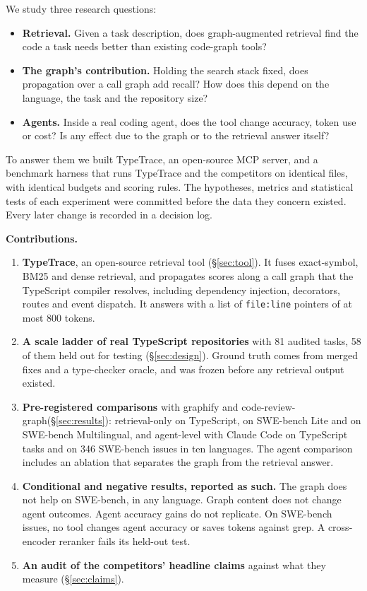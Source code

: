 \documentclass[sigconf,nonacm]{acmart}
\newcommand{\tool}{TypeTrace\xspace}
\newcommand{\gfy}{graphify\xspace}
\newcommand{\crg}{code-review-graph\xspace}
\begin{document}
We study three research questions:
\begin{itemize}
\item[\textbf{RQ1}] \textbf{Retrieval.} Given a task description, does graph-augmented retrieval find the code a task needs better than existing code-graph tools?
\item[\textbf{RQ2}] \textbf{The graph's contribution.} Holding the search stack fixed, does propagation over a call graph add recall? How does this depend on the language, the task and the repository size?
\item[\textbf{RQ3}] \textbf{Agents.} Inside a real coding agent, does the tool change accuracy, token use or cost? Is any effect due to the graph or to the retrieval answer itself?
\end{itemize}

To answer them we built \tool, an open-source MCP server, and a benchmark harness that runs \tool and the competitors on identical files, with identical budgets and scoring rules. The hypotheses, metrics and statistical tests of each experiment were committed before the data they concern existed. Every later change is recorded in a decision log.

\smallskip\noindent\textbf{Contributions.}
\begin{enumerate}
\item \textbf{\tool}, an open-source retrieval tool (\S\ref{sec:tool}). It fuses exact-symbol, BM25 and dense retrieval, and propagates scores along a call graph that the TypeScript compiler resolves, including dependency injection, decorators, routes and event dispatch. It answers with a list of \texttt{file:line} pointers of at most 800 tokens.
\item \textbf{A scale ladder of real TypeScript repositories} with 81 audited tasks, 58 of them held out for testing (\S\ref{sec:design}). Ground truth comes from merged fixes and a type-checker oracle, and was frozen before any retrieval output existed.
\item \textbf{Pre-registered comparisons} with \gfy and \crg (\S\ref{sec:results}): retrieval-only on TypeScript, on SWE-bench Lite and on SWE-bench Multilingual, and agent-level with Claude Code on TypeScript tasks and on 346 SWE-bench issues in ten languages. The agent comparison includes an ablation that separates the graph from the retrieval answer.
\item \textbf{Conditional and negative results, reported as such.} The graph does not help on SWE-bench, in any language. Graph content does not change agent outcomes. Agent accuracy gains do not replicate. On SWE-bench issues, no tool changes agent accuracy or saves tokens against grep. A cross-encoder reranker fails its held-out test.
\item \textbf{An audit of the competitors' headline claims} against what they measure (\S\ref{sec:claims}).
\end{enumerate}
\end{document}
